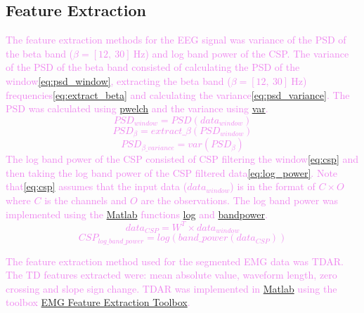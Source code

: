 \subsection{Feature Extraction}
\textcolor{violet}{The feature extraction methods for the EEG signal was variance of the PSD of the beta band ($\beta = [12,\:30]\:\text{Hz}$) and log band power of the CSP.}
\textcolor{violet}{The variance of the PSD of the beta band consisted of calculating the PSD of the window\:\eqref{eq:psd_window}, extracting the beta band ($\beta = [12,\:30]\:\text{Hz}$) frequencies\:\eqref{eq:extract_beta} and calculating the variance\:\eqref{eq:psd_variance}. The PSD was calculated using \href{https://se.mathworks.com/help/signal/ref/pwelch.html}{pwelch} and the variance using \href{https://se.mathworks.com/help/matlab/ref/var.html}{var}.}
\textcolor{violet}{
	\begin{dmath}
		\label{eq:psd_window}
		PSD_{window} = PSD(data_{window})
	\end{dmath}
	\begin{dmath}
		\label{eq:extract_beta}
		PSD_{\beta} = extract\_\beta(PSD_{window})
	\end{dmath}
	\begin{dmath}
		\label{eq:psd_variance}
		PSD_{\beta\_variance} = var(PSD_{\beta})
	\end{dmath}}
\textcolor{violet}{The log band power of the CSP consisted of CSP filtering the window\:\eqref{eq:csp} and then taking the log band power of the CSP filtered data\:\eqref{eq:log_power}. Note that\:\eqref{eq:csp} assumes that the input data ($data_{window}$) is in the format of $C \times O$ where $C$ is the channels and $O$ are the observations. The log band power was implemented using the \href{https://se.mathworks.com/products/matlab.html}{Matlab} functions \href{https://se.mathworks.com/help/matlab/ref/log.html}{log} and \href{https://se.mathworks.com/help/signal/ref/bandpower.html}{bandpower}.}
\textcolor{violet}{
	\begin{dmath}
		\label{eq:csp}
		data_{CSP} = W^T \times data_{window}
	\end{dmath}
	\begin{dmath}
		\label{eq:log_power}
		CSP_{log\_band\_power} = log(band\_power(data_{CSP}))
	\end{dmath}
}

\textcolor{violet}{The feature extraction method used for the segmented EMG data was TDAR. The TD features extracted were: mean absolute value, waveform length, zero crossing and slope sign change. TDAR was implemented in \href{https://se.mathworks.com/products/matlab.html}{Matlab} using the toolbox \href{https://se.mathworks.com/matlabcentral/fileexchange/71514-emg-feature-extraction-toolbox}{EMG Feature Extraction Toolbox}.}

